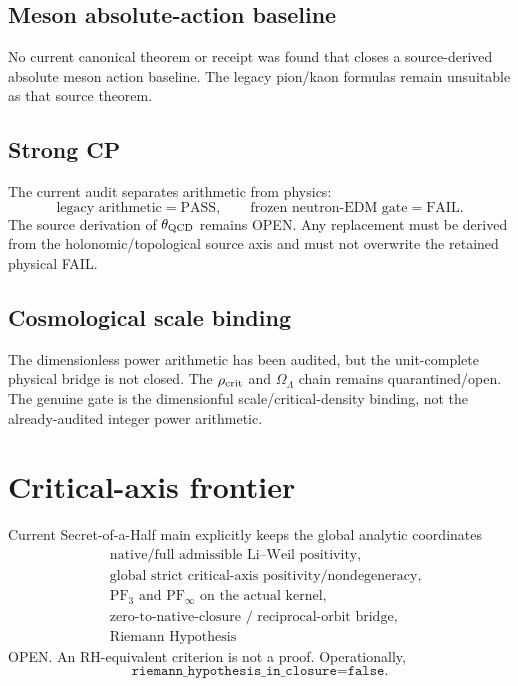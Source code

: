 \subsection{Meson absolute-action baseline}

No current canonical theorem or receipt was found that closes a source-derived
absolute meson action baseline. The legacy pion/kaon formulas remain unsuitable
as that source theorem.

\subsection{Strong CP}

The current audit separates arithmetic from physics:
\[
\boxed{
\text{legacy arithmetic}=\mathrm{PASS},
\qquad
\text{frozen neutron-EDM gate}=\mathrm{FAIL}.
}
\]
The source derivation of \(\theta_{\rm QCD}\) remains OPEN. Any replacement must
be derived from the holonomic/topological source axis and must not overwrite
the retained physical FAIL.

\subsection{Cosmological scale binding}

The dimensionless power arithmetic has been audited, but the unit-complete
physical bridge is not closed. The \(\rho_{\rm crit}\) and
\(\Omega_\Lambda\) chain remains quarantined/open. The genuine gate is the
dimensionful scale/critical-density binding, not the already-audited integer
power arithmetic.

\section{Critical-axis frontier}

Current Secret-of-a-Half main explicitly keeps the global analytic coordinates
\[
\boxed{
\begin{aligned}
&\text{native/full admissible Li--Weil positivity},\\
&\text{global strict critical-axis positivity/nondegeneracy},\\
&\mathrm{PF}_3\text{ and }\mathrm{PF}_\infty\text{ on the actual kernel},\\
&\text{zero-to-native-closure / reciprocal-orbit bridge},\\
&\text{Riemann Hypothesis}
\end{aligned}}
\]
OPEN. An RH-equivalent criterion is not a proof. Operationally,
\[
\boxed{\texttt{riemann\_hypothesis\_in\_closure=false}.}
\]

